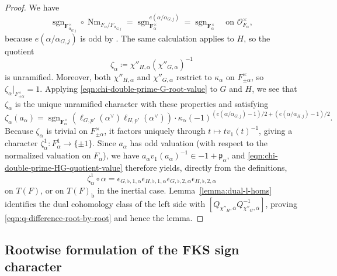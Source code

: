 \documentclass[reqno]{amsart}
\numberwithin{equation}{subsection}
\newcommand{\F}{\mathbf{F}}
\newcommand{\sgn}{\operatorname{sgn}}
\newcommand{\ol}[1]{\overline{#1}}
\newcommand{\co}{\colon}
\newcommand\cO{\mathcal{O}}
\newcommand\frp{\mathfrak{p}}
\DeclareMathOperator{\Nm}{Nm}
\theoremstyle{remark}
\numberwithin{equation}{subsection}
\numberwithin{figure}{subsection}
\begin{document}
\begin{proof}
We have
\[
\sgn_{\F_{\alpha_{G,j}}^\times}\circ \Nm_{F_\alpha/F_{\alpha_{G,j}}}
=\sgn_{\F_\alpha^\times}^{e(\alpha/\alpha_{G,j})}
=\sgn_{\F_\alpha^\times}
\quad\text{on }\cO_{F_\alpha}^\times,
\]
because $e(\alpha/\alpha_{G,j})$ is odd by \cite[Lemma 5.6.5]{FKS23}. The same calculation applies to $H$, so the quotient
\[
\zeta_\alpha\coloneqq\chi''_{H,\alpha}(\chi''_{G,\alpha})^{-1}
\]
is unramified. Moreover, both $\chi''_{H,\alpha}$ and $\chi''_{G,\alpha}$ restrict to $\kappa_\alpha$ on $F_{\pm\alpha}^\times$, so $\zeta_\alpha|_{F_{\pm\alpha}^\times}=1$. Applying \eqref{eqn:chi-double-prime-G-root-value} to $G$ and $H$, we see that $\zeta_\alpha$ is the unique unramified character with these properties and satisfying
\begin{equation}\label{eqn:chi-double-prime-HG-quotient-value}
\zeta_\alpha(a_\alpha) = \sgn_{\F_\alpha^\times}(\ell_{G,p'}(\alpha^\vee)\ell_{H,p'}(\alpha^\vee))\cdot\kappa_\alpha(-1)^{(e(\alpha/\alpha_{G,j})-1)/2 + (e(\alpha/\alpha_{H,j})-1)/2}.
\end{equation}
Because $\zeta_\alpha$ is trivial on $F_{\pm\alpha}^\times$, it factors uniquely through $t\mapsto tv_1(t)^{-1}$, giving a character $\zeta^1_\alpha\co F_\alpha^1\to\{\pm1\}$. Since $a_\alpha$ has odd valuation (with respect to the normalized valuation on $F_\alpha$), we have $a_\alpha v_1(a_\alpha)^{-1}\in-1+\frp_\alpha$, and \eqref{eqn:chi-double-prime-HG-quotient-value} therefore yields, directly from the definitions,
\[
\zeta^1_\alpha\circ\alpha
=\epsilon_{G,\flat,1,\alpha}\epsilon_{H,\flat,1,\alpha}
    \epsilon_{G,\flat,2,\alpha}\epsilon_{H,\flat,2,\alpha}
\]
on $T(F)$, or on $T(F)_{\mathrm b}$ in the inertial case. Lemma~\ref{lemma:dual-l-homs} identifies the dual cohomology class of the left side with $[Q_{\chi''_H,\ol\alpha}Q_{\chi''_G,\ol\alpha}^{-1}]$, proving \eqref{eqn:q-difference-root-by-root} and hence the lemma.
\end{proof}




\subsection{Rootwise formulation of the FKS sign character}\label{app:fks-rootwise-formulation}
\end{document}
